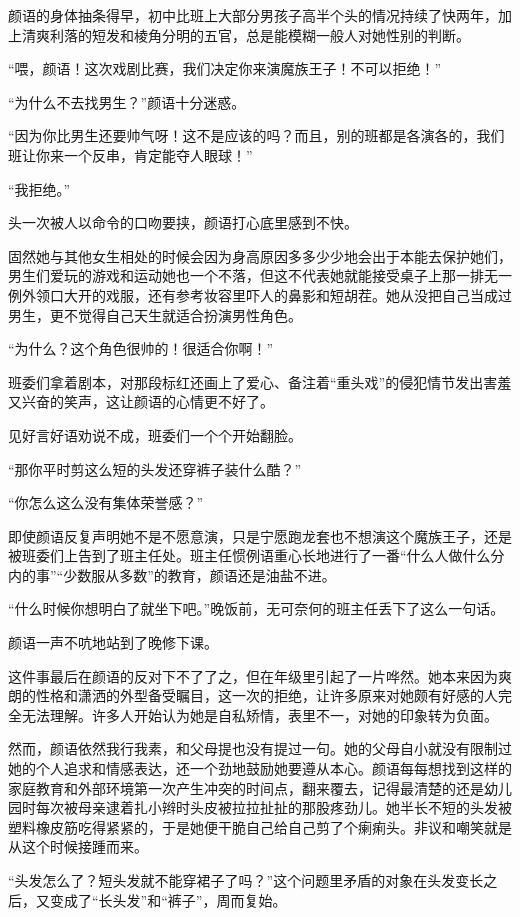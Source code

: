 \documentclass[UTF8, scheme = chinese, openany]{ctexbook}
\begin{document}
颜语的身体抽条得早，初中比班上大部分男孩子高半个头的情况持续了快两年，加上清爽利落的短发和棱角分明的五官，总是能模糊一般人对她性别的判断。

“喂，颜语！这次戏剧比赛，我们决定你来演魔族王子！不可以拒绝！”

“为什么不去找男生？”颜语十分迷惑。

“因为你比男生还要帅气呀！这不是应该的吗？而且，别的班都是各演各的，我们班让你来一个反串，肯定能夺人眼球！”

“我拒绝。”

头一次被人以命令的口吻要挟，颜语打心底里感到不快。

固然她与其他女生相处的时候会因为身高原因多多少少地会出于本能去保护她们，男生们爱玩的游戏和运动她也一个不落，但这不代表她就能接受桌子上那一排无一例外领口大开的戏服，还有参考妆容里吓人的鼻影和短胡茬。她从没把自己当成过男生，更不觉得自己天生就适合扮演男性角色。

“为什么？这个角色很帅的！很适合你啊！”

班委们拿着剧本，对那段标红还画上了爱心、备注着“重头戏”的侵犯情节发出害羞又兴奋的笑声，这让颜语的心情更不好了。

见好言好语劝说不成，班委们一个个开始翻脸。

“那你平时剪这么短的头发还穿裤子装什么酷？”

“你怎么这么没有集体荣誉感？”

即使颜语反复声明她不是不愿意演，只是宁愿跑龙套也不想演这个魔族王子，还是被班委们上告到了班主任处。班主任惯例语重心长地进行了一番“什么人做什么分内的事”“少数服从多数”的教育，颜语还是油盐不进。

“什么时候你想明白了就坐下吧。”晚饭前，无可奈何的班主任丢下了这么一句话。

颜语一声不吭地站到了晚修下课。

这件事最后在颜语的反对下不了了之，但在年级里引起了一片哗然。她本来因为爽朗的性格和潇洒的外型备受瞩目，这一次的拒绝，让许多原来对她颇有好感的人完全无法理解。许多人开始认为她是自私矫情，表里不一，对她的印象转为负面。

然而，颜语依然我行我素，和父母提也没有提过一句。她的父母自小就没有限制过她的个人追求和情感表达，还一个劲地鼓励她要遵从本心。颜语每每想找到这样的家庭教育和外部环境第一次产生冲突的时间点，翻来覆去，记得最清楚的还是幼儿园时每次被母亲逮着扎小辫时头皮被拉拉扯扯的那股疼劲儿。她半长不短的头发被塑料橡皮筋吃得紧紧的，于是她便干脆自己给自己剪了个瘌痢头。非议和嘲笑就是从这个时候接踵而来。

“头发怎么了？短头发就不能穿裙子了吗？”这个问题里矛盾的对象在头发变长之后，又变成了“长头发”和“裤子”，周而复始。
\end{document}
